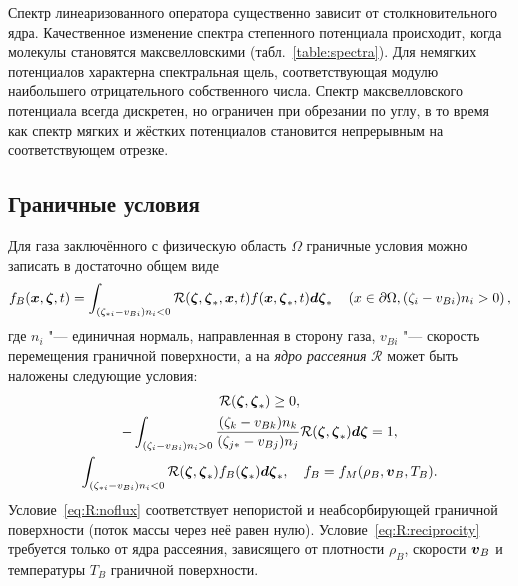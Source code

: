 Спектр линеаризованного оператора существенно зависит от столкновительного ядра.
Качественное изменение спектра степенного потенциала происходит, когда молекулы становятся максвелловскими (табл.~\ref{table:spectra}).
Для немягких потенциалов характерна спектральная щель, соответствующая модулю наибольшего отрицательного собственного числа.
Спектр максвелловского потенциала всегда дискретен, но ограничен при обрезании по углу,
в то время как спектр мягких и жёстких потенциалов становится непрерывным на соответствующем отрезке.

\subsection{Граничные условия}

Для газа заключённого с физическую область \(\Omega\) граничные условия можно записать в достаточно общем виде
\begin{equation}\label{eq:scatterring_kernel}
    f_B({\boldsymbol{x}},{\boldsymbol{\zeta}},t) = \int_{(\zeta_{*i}-v_{Bi})n_i<0} \mathcal{R}({\boldsymbol{\zeta}},{\boldsymbol{\zeta}}_*,{\boldsymbol{x}},t)f({\boldsymbol{x}},{\boldsymbol{\zeta}}_*,t)\boldsymbol{d\zeta}_*
    \quad \left( x\in\partial\Omega, (\zeta_i-v_{Bi})n_i>0 \right),
\end{equation}
где \(n_i\) "--- единичная нормаль, направленная в сторону газа,
\(v_{Bi}\) "--- скорость перемещения граничной поверхности,
а на \emph{ядро рассеяния} \(\mathcal{R}\) может быть наложены следующие условия:
\begin{gather}
    \mathcal{R}({\boldsymbol{\zeta}},{\boldsymbol{\zeta}}_*) \geq 0, \label{eq:R:positivity}\\
    -\int_{(\zeta_i-v_{Bi})n_i>0} \frac{(\zeta_k-v_{Bk})n_k}{(\zeta_{j*}-v_{Bj})n_j} \mathcal{R}({\boldsymbol{\zeta}},{\boldsymbol{\zeta}}_*)\boldsymbol{d\zeta} = 1, \label{eq:R:noflux}\\
    \int_{(\zeta_{*i}-v_{Bi})n_i<0} \mathcal{R}({\boldsymbol{\zeta}},{\boldsymbol{\zeta}}_*)f_B({\boldsymbol{\zeta}}_*)\boldsymbol{d\zeta}_*, \quad f_B = f_M(\rho_B, {\boldsymbol{v}}_B, T_B). \label{eq:R:reciprocity}
\end{gather}
Условие~\eqref{eq:R:noflux} соответствует непористой и неабсорбирующей граничной поверхности
(поток массы через неё равен нулю).
Условие~\eqref{eq:R:reciprocity} требуется только от ядра рассеяния,
зависящего от плотности \(\rho_B\), скорости \({\boldsymbol{v}}_B\) и температуры \(T_B\) граничной поверхности.

